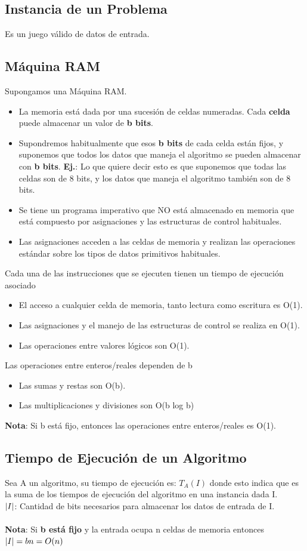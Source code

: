 \documentclass[10pt,a4paper]{article}
\begin{document}
\subsection*{Instancia de un Problema}
Es un juego válido de datos de entrada.
\subsection*{Máquina RAM}
Supongamos una Máquina RAM. 
\begin{itemize}
    \item La memoria está dada por una sucesión de celdas numeradas. Cada \textbf{celda} puede almacenar un valor de \textbf{b bits}. 
    \item Supondremos habitualmente que esos \textbf{b bits} de cada celda están fijos, y suponemos que todos los datos que maneja el algoritmo se pueden almacenar con \textbf{b bits}. 
    \textbf{Ej.}: Lo que quiere decir esto es que suponemos que todas las celdas son de 8 bits, y los datos que maneja el algoritmo también son de 8 bits.
    \item Se tiene un programa imperativo que NO está almacenado en memoria que está compuesto por asignaciones y las estructuras de control habituales.
    \item Las asignaciones acceden a las celdas de memoria y realizan las operaciones estándar sobre los tipos de datos primitivos habituales.
\end{itemize}
Cada una de las instrucciones que se ejecuten tienen un tiempo de ejecución asociado
\begin{itemize}
    \item El acceso a cualquier celda de memoria, tanto lectura como escritura es O(1).
    \item Las asignaciones y el manejo de las estructuras de control se realiza en O(1).
    \item Las operaciones entre valores lógicos son O(1).
\end{itemize}
Las operaciones entre enteros/reales dependen de b
\begin{itemize}
    \item Las sumas y restas son O(b).
    \item Las multiplicaciones y divisiones son O(b log b)
\end{itemize}
\textbf{Nota}: Si b está fijo, entonces las operaciones entre enteros/reales es O(1).
\subsection*{Tiempo de Ejecución de un Algoritmo}
Sea A un algoritmo, su tiempo de ejecución es: $T_{A}(I)$ donde esto indica que es la suma de los tiempos de ejecución del algoritmo en una instancia dada I. \\
\textbf{$|I|$}: Cantidad de bits necesarios para almacenar los datos de entrada de I. \\ \\
\textbf{Nota}: Si \textbf{b está fijo} y la entrada ocupa n celdas de memoria entonces $|I| = bn = O(n)$
\end{document}
